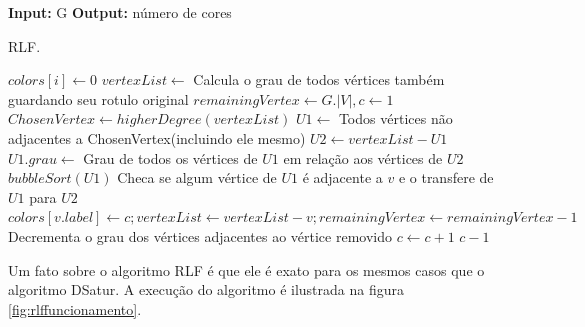 \documentclass[12pt]{article}
\begin{document}
\begin{algorithm}
\textbf{Input:} G
\textbf{Output:} número de cores
\caption{RLF.}\label{alg:coloringRLF}
\begin{algorithmic}[1]
   \State $colors[i] \gets 0$
\EndFor
\State $vertexList \gets$ Calcula o grau de todos vértices também guardando seu rotulo original
\State $remainingVertex \gets G.|V|, c \gets 1$
\State $ChosenVertex\gets higherDegree(vertexList)$
\State $U1 \gets$ Todos vértices não adjacentes a ChosenVertex(incluindo ele mesmo)
\State $U2 \gets vertexList-U1$
\State $U1.grau \gets$ Grau de todos os vértices de $U1$ em relação aos vértices de $U2$
\State $bubbleSort(U1)$
\label{alg:coloringRLF:for}
\State Checa se algum vértice de $U1$ é adjacente a $v$ e o transfere de $U1$ para $U2$\label{alg:coloringRLF:u1}
\State $colors[v.label]\gets c; vertexList \gets vertexList - v; remainingVertex\gets remainingVertex-1$
\State Decrementa o grau dos vértices adjacentes ao vértice removido
\EndFor
\State $c \gets c + 1$
\EndWhile
\State \Return $c-1$
\EndProcedure
\end{algorithmic}
\end{algorithm}

Um fato sobre o algoritmo RLF é que ele é exato para os mesmos casos que o algoritmo DSatur. A execução do algoritmo é ilustrada na figura \ref{fig:rlffuncionamento}.
\end{document}
